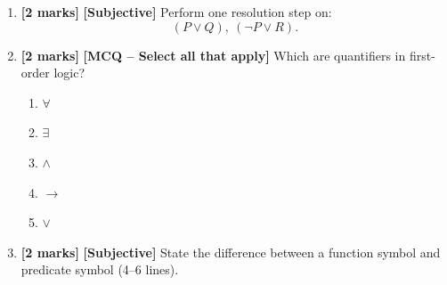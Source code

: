 \documentclass[11pt,a4paper]{article}
\newcommand{\EMarks}{\textbf{[2 marks]} }
\begin{document}
\begin{enumerate}[label=\textbf{E\arabic*.}, leftmargin=*]
  \item \EMarks \textbf{[Subjective]} Perform one resolution step on:
    \[
      (P \lor Q),\ (\lnot P \lor R).
    \]

  \item \EMarks \textbf{[MCQ -- Select all that apply]} Which are quantifiers in first-order logic?
    \begin{enumerate}[label=(\Alph*), leftmargin=*]
      \item $\forall$
      \item $\exists$
      \item $\land$
      \item $\rightarrow$
      \item $\lor$
    \end{enumerate}

  \item \EMarks \textbf{[Subjective]} State the difference between a function symbol and predicate symbol (4--6 lines).
\end{enumerate}
\end{document}
